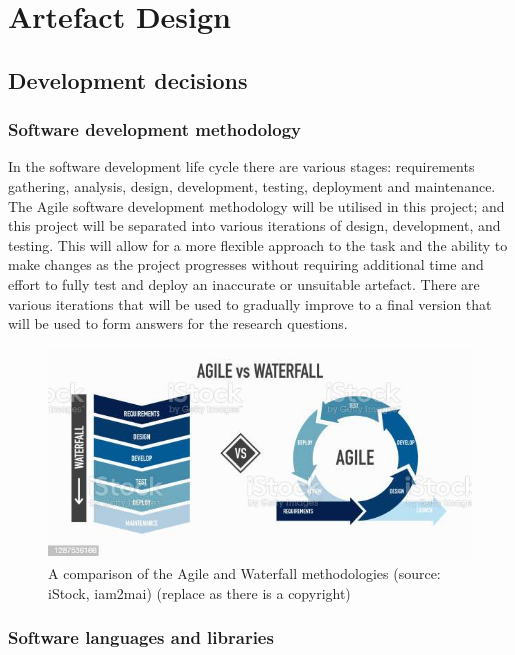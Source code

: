 \chapter{Artefact Design} \label{chap:artefact-design}
\section{Development decisions}
\subsection{Software development methodology}
In the software development life cycle there are various stages: requirements gathering, analysis, design,
development, testing, deployment and maintenance.\\
The Agile software development methodology will be utilised in this project; and this project will be separated
into various iterations of design, development, and testing. This will allow for a more flexible approach to
the task and the ability to make changes as the project progresses without requiring additional time and effort
to fully test and deploy an inaccurate or unsuitable artefact.
There are various iterations that will be used to gradually improve to a final version that will be used to
form answers for the research questions.
\begin{figure}
    \centering
    \includegraphics[width=\columnwidth]{figures/development_methodologies.jpg}
    \caption{A comparison of the Agile and Waterfall methodologies (source: iStock, iam2mai)
    (replace as there is a copyright)}
    \label{fig:development_methodologies}
\end{figure}
\FloatBarrier

\subsection{Software languages and libraries}
